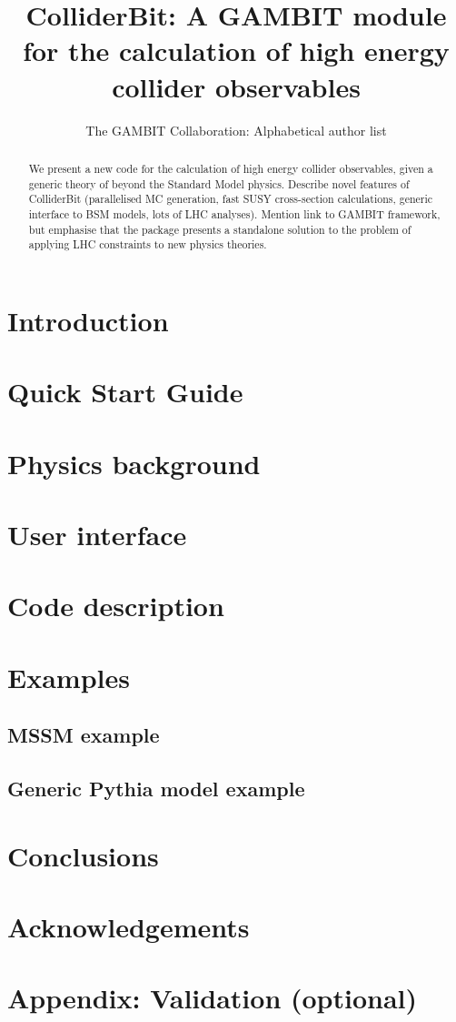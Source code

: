 \documentclass[11pt,a4paper]{article}
\title{ColliderBit: A GAMBIT module for the calculation of high energy collider observables}
\author{The GAMBIT Collaboration: Alphabetical author list} %
\begin{document}
\maketitle

\begin{abstract}
We present a new code for the calculation of high energy collider observables, given a generic theory of beyond the Standard Model physics. Describe novel features of ColliderBit (parallelised MC generation, fast SUSY cross-section calculations, generic interface to BSM models, lots of LHC analyses). Mention link to GAMBIT framework, but emphasise that the package presents a standalone solution to the problem of applying LHC constraints to new physics theories.
\end{abstract}

\section{Introduction}


\section{Quick Start Guide}


\section{Physics background}


\section{User interface}


\section{Code description}



\section{Examples}


\subsection{MSSM example}


\subsection{Generic Pythia model example}



\section{Conclusions}

\section{Acknowledgements}

\section{Appendix: Validation (optional)}
\end{document}
